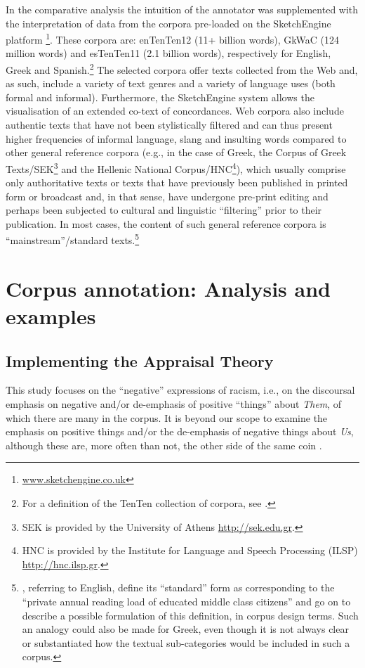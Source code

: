 \documentclass[output=paper]{LSP/langsci}
\begin{document}
In the comparative analysis the intuition of the annotator was supplemented with the interpretation of data from the corpora pre-loaded on the SketchEngine platform \citep{Kilgarriff2004}\footnote{\url{www.sketchengine.co.uk}}. These corpora are: enTenTen12 (11+ billion words), GkWaC (124 million words) and esTenTen11 (2.1 billion words), respectively for English, Greek and Spanish.\footnote{For a definition of the TenTen collection of corpora, see \citet{ Jakubicek2013}.} The selected corpora offer texts collected from the Web and, as such, include a variety of text genres and a variety of language uses (both formal and informal). Furthermore, the SketchEngine system allows the visualisation of an extended co-text of concordances. Web corpora also include authentic texts that have not been stylistically filtered and can thus present higher frequencies of informal language, slang and insulting words compared to other general reference corpora (e.g., in the case of Greek, the Corpus of Greek Texts/SEK\footnote{SEK is provided by the University of Athens \url{http://sek.edu.gr}.} and the Hellenic National Corpus/HNC\footnote{HNC is provided by the Institute for Language and Speech Processing (ILSP) \url{http://hnc.ilsp.gr}.}), which usually comprise only authoritative texts or texts that have previously been published in printed form or broadcast and, in that sense, have undergone pre-print editing and perhaps been subjected to cultural and linguistic “filtering” prior to their publication. In most cases, the content of such general reference corpora is “mainstream”/standard texts.\footnote{\citet[65-66]{Teubert2007}, referring to English, define its “standard” form as corresponding to the “private annual reading load of educated middle class citizens” and go on to describe a possible formulation of this definition, in corpus design terms. Such an analogy could also be made for Greek, even though it is not always clear or substantiated how the textual sub-categories would be included in such a corpus.}

\section{Corpus annotation: Analysis and examples} \label{sec:2:4} 
\subsection{Implementing the Appraisal Theory} \label{sec:2:4:1}

This study focuses on the “negative” expressions of racism, i.e., on the discoursal emphasis on negative and/or de-emphasis of positive “things” about \textit{Them}, of which there are many in the corpus. It is beyond our scope to examine the emphasis on positive things and/or the de-emphasis of negative things about \textit{Us}, although these are, more often than not, the other side of the same coin \citep[44]{Dijk2000b}.
\end{document}
